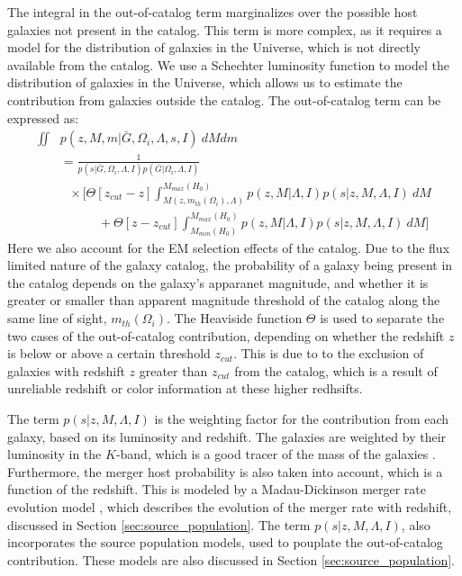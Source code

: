 The integral in the out-of-catalog term marginalizes over the possible host galaxies not present in the catalog. This term is more complex, as it requires a model for the distribution of galaxies in the Universe, which is not directly available from the catalog. We use a Schechter luminosity function to model the distribution of galaxies in the Universe, which allows us to estimate the contribution from galaxies outside the catalog. The out-of-catalog term can be expressed as:
\begin{align}
  \iint & p(z, M, m|\bar{G},\Omega_i, \Lambda, s, I)~dM dm \nonumber \\
  &= \frac{1}{p(s|\bar{G},\Omega_i, \Lambda, I)p(\bar{G}|\Omega_i, \Lambda, I)} \nonumber \\ 
  &~~~\times \Bigg[\Theta[z_{cut} -z] \int_{M(z,m_{th}(\Omega_i), \Lambda)}^{M_{max}(H_0)} p(z,M|\Lambda, I) p(s|z,M,\Lambda,I)~dM \nonumber \\
  &\qquad \quad + \Theta[z-z_{cut}] \int_{M_{min}(H_0)}^{M_{max}(H_0)} p(z,M|\Lambda, I) p(s|z,M,\Lambda,I)~dM \Bigg]
\end{align}
Here we also account for the \ac{EM} selection effects of the catalog. Due to the flux limited nature of the galaxy catalog, the probability of a galaxy being present in the catalog depends on the galaxy's apparanet magnitude, and whether it is greater or smaller than apparent magnitude threshold of the catalog along the same line of sight, $m_{th}(\Omega_i)$. The Heaviside function $\Theta$ is used to separate the two cases of the out-of-catalog contribution, depending on whether the redshift $z$ is below or above a certain threshold $z_{cut}$. This is due to to the exclusion of galaxies with redshift $z$ greater than $z_{cut}$ from the catalog, which is a result of unreliable redshift or color information at these higher redhsifts. 

The term $p(s|z,M,\Lambda,I)$ is the weighting factor for the contribution from each galaxy, based on its luminosity and redshift. The galaxies are weighted by their luminosity in the $K$-band, which is a good tracer of the mass of the galaxies \citep{strazzullo2006near,sureshkumar2021galaxy}. Furthermore, the merger host probability is also taken into account, which is a function of the redshift. This is modeled by a Madau-Dickinson merger rate evolution model \citep{madau2014cosmic}, which describes the evolution of the merger rate with redshift, discussed in Section \ref{sec:source_population}. The term $p(s|z,M,\Lambda,I)$, also incorporates the source population models, used to pouplate the out-of-catalog contribution. These models are also discussed in Section \ref{sec:source_population}.


